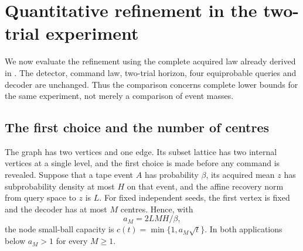 \section{Quantitative refinement in the two-trial experiment}
\label{sec:v29-evaluated}
We now evaluate the refinement using the complete acquired law already
derived in . The detector, command
law, two-trial horizon, four equiprobable queries and decoder are
unchanged. Thus the comparison concerns complete lower bounds for the
same experiment, not merely a comparison of event masses.

\subsection{The first choice and the number of centres}
The graph has two vertices and one edge. Its subset lattice has two
internal vertices at a single level, and the first choice is made before
any command is revealed. Suppose that a tape event $A$ has probability
$\beta$, its acquired mean $z$ has subprobability density at most $H$
on that event, and the affine recovery norm from query space to $z$ is
$L$. For fixed independent seeds, the first vertex is fixed and the
decoder has at most $M$ centres. Hence, with
\[
                         a_M=2LMH/\beta,
\]
the node small-ball capacity is $c(t)=\min\{1,a_M\sqrt t\}$.
In both applications below $a_M>1$ for every $M\ge1$.

